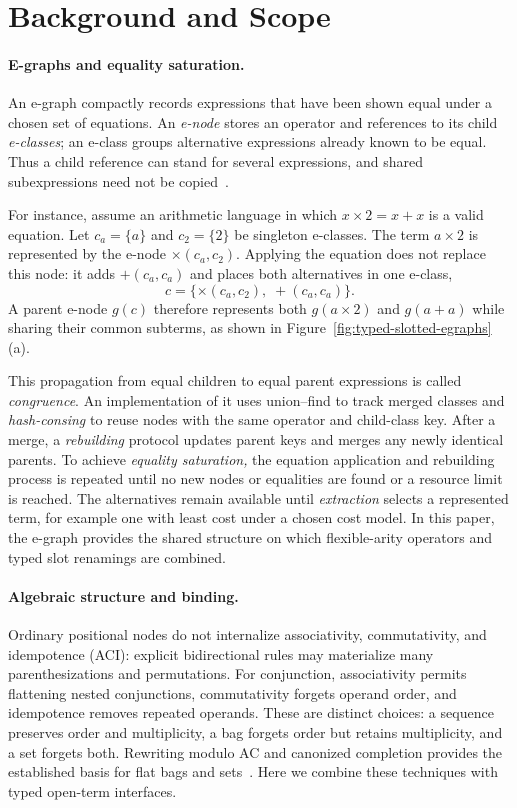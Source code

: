 \section{Background and Scope}
\label{sec:background}

\paragraph{E-graphs and equality saturation.}
An e-graph compactly records expressions that have been shown equal under a
chosen set of equations. An \emph{e-node} stores an operator and references to
its child \emph{e-classes}; an e-class groups alternative expressions already
known to be equal. Thus a child reference can stand for several expressions,
and shared subexpressions need not be copied~\cite{ogEgraphs1,egraphsOG,egg}.

For instance, assume an arithmetic language in which $x\times 2=x+x$ is a valid
equation. Let $c_a=\{a\}$ and $c_2=\{2\}$ be singleton e-classes.
The term $a\times 2$ is represented by the e-node
$\times(c_a,c_2)$. Applying the equation does not replace this node:
it adds $+(c_a,c_a)$ and places both alternatives in one e-class,
$$
c=\{\times(c_a,c_2),\; +(c_a,c_a)\}.
$$
A parent e-node $g(c)$ therefore represents both $g(a\times 2)$ and
$g(a+a)$ while sharing their common subterms, as shown in Figure~\ref{fig:typed-slotted-egraphs}(a). 


This propagation from equal children to equal parent expressions is called 
\emph{congruence}. %
An implementation of it uses union--find to track merged
classes and \emph{hash-consing} to reuse nodes with the same operator and
child-class key. After a merge, a \emph{rebuilding} protocol updates parent keys and
merges any newly identical parents. To achieve \emph{equality saturation,} the
equation application and rebuilding process is repeated until no new nodes or equalities are found or a
resource limit is reached. The alternatives remain available until
\emph{extraction} selects a represented term, for example one with least
cost under a chosen cost model. In this paper, the e-graph provides the
shared structure on which flexible-arity operators and typed slot renamings
are combined.

\paragraph{Algebraic structure and binding.}
Ordinary positional nodes do not internalize associativity, commutativity,
and idempotence (ACI): explicit bidirectional rules may materialize many
parenthesizations and permutations. For conjunction, associativity permits
flattening nested conjunctions, commutativity forgets operand order, and
idempotence removes repeated operands. These are distinct choices: a
sequence preserves order and multiplicity, a bag forgets order but retains
multiplicity, and a set forgets both. Rewriting modulo AC and canonized
completion provides the established basis for flat bags and
sets~\cite{conchon2012canonized,kapur2021ModularAC}. Here we combine these
techniques with typed open-term interfaces.

